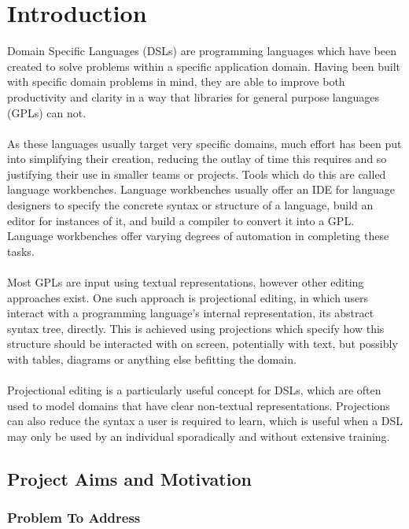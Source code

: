 \documentclass{article}
\begin{document}
\clearpage
\tableofcontents
\clearpage

\section{Introduction}

Domain Specific Languages (DSLs) are programming languages which have been created to solve problems within a specific application domain. Having been built with specific domain problems in mind, they are able to improve both productivity and clarity in a way that libraries for general purpose languages (GPLs) can not. 
\\
\\
As these languages usually target very specific domains, much effort has been put into simplifying their creation, reducing the outlay of time this requires and so justifying their use in smaller teams or projects. Tools which do this are called language workbenches. Language workbenches usually offer an IDE for language designers to specify the concrete syntax or structure of a language, build an editor for instances of it, and build a compiler to convert it into a GPL. Language workbenches offer varying degrees of automation in completing these tasks.
\\
\\
Most GPLs are input using textual representations, however other editing approaches exist. One such approach is projectional editing, in which users interact with a programming language's internal representation, its abstract syntax tree, directly. This is achieved using projections which specify how this structure should be interacted with on screen, potentially with text, but possibly with tables, diagrams or anything else befitting the domain. 
\\
\\
Projectional editing is a particularly useful concept for DSLs, which are often used to model domains that have clear non-textual representations. Projections can also reduce the syntax a user is required to learn, which is useful when a DSL may only be used by an individual sporadically and without extensive training.

\subsection{Project Aims and Motivation}

\subsubsection{Problem To Address}\label{problem}
\end{document}
